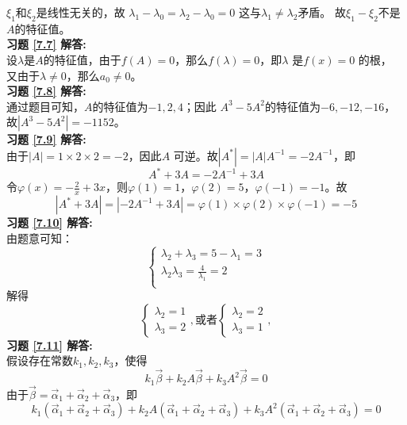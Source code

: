 $\xi_1$和$\xi_2$是线性无关的，故
$\lambda_1-\lambda_0=\lambda_2-\lambda_0=0$
这与$\lambda_1\neq\lambda_2$矛盾。
故$\xi_1-\xi_2$不是$A$的特征值。\\
\textbf{习题 \ref{7.7} 解答:}\\
设$\lambda$是$A$的特征值，由于$f(A)=0$，那么$f(\lambda)=0$，即$\lambda$ 是$f(x)=0$ 的根，
 又由于$\lambda\neq0$，那么$a_0\neq0$。\\
\textbf{习题 \ref{7.8} 解答:}\\
通过题目可知，$A$的特征值为$-1,2,4$；因此
$A^3-5A^2$的特征值为$-6,-12,-16$，故$|A^3-5A^2|=-1152$。\\
\textbf{习题 \ref{7.9} 解答:}\\
由于$|A|=1\times2\times2=-2$，因此$A$ 可逆。故$|A^*|=|A|A^{-1}=-2A^{-1}$，即
\begin{equation*}
  A^*+3A=-2A^{-1}+3A
\end{equation*}
令$\varphi(x)=-\frac{2}{x}+3x$，则$\varphi(1)=1$，$\varphi(2)=5$，$\varphi(-1)=-1$。故
\begin{equation*}
  |A^*+3A|=|-2A^{-1}+3A|=\varphi(1)\times\varphi(2)\times\varphi(-1)=-5
\end{equation*}
\textbf{习题 \ref{7.10} 解答:}\\
由题意可知：
\begin{equation*}
  \begin{cases}
  \lambda_2+\lambda_3=5-\lambda_1=3\\
  \lambda_2\lambda_3=\frac{4}{\lambda_1}=2\\
  \end{cases}
\end{equation*}
解得
\begin{equation*}
  \begin{cases}
  \lambda_2=1\\
  \lambda_3=2
  \end{cases},
  \text{或者}
    \begin{cases}
  \lambda_2=2\\
  \lambda_3=1
  \end{cases},
\end{equation*}
\textbf{习题 \ref{7.11} 解答:}\\
假设存在常数$k_1,k_2,k_3$，使得
\begin{equation*}
  k_1\vec{\beta}+k_2A\vec{\beta}+k_3A^2\vec{\beta}=0
\end{equation*}
由于$\vec{\beta}=\vec{\alpha}_1+\vec{\alpha}_2+\vec{\alpha}_3$，即
\begin{equation*}
  k_1(\vec{\alpha}_1+\vec{\alpha}_2+\vec{\alpha}_3)+
  k_2A(\vec{\alpha}_1+\vec{\alpha}_2+\vec{\alpha}_3)+
  k_3A^2(\vec{\alpha}_1+\vec{\alpha}_2+\vec{\alpha}_3)=0
\end{equation*}
